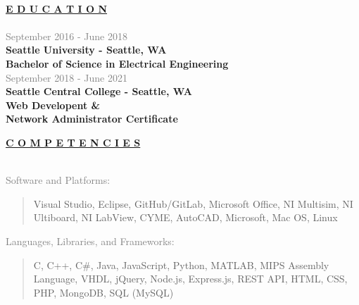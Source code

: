 \documentclass[letterpage]{article}
\begin{document}
\vspace*{20px}\\ %
\begin{minipage}[t]{0.424\linewidth}
\vspace{0pt}

\textbf{\fontsize{14px}{1px}\selectfont
  \ul{E D U C A T I O N}
}\\
\vspace{5px}\\
\textcolor{gray}{September 2016 - June 2018}\\
\textbf{\textsf{Seattle University - Seattle, WA}}\\
\textbf{Bachelor of Science in Electrical Engineering}\\

\textcolor{gray}{September 2018 - June 2021}\\
\textbf{\textsf{Seattle Central College - Seattle, WA}}\\
\textbf{Web Developent \& }\\
\textbf{Network Administrator Certificate}\\
\vspace{19px}

\textbf{\fontsize{14px}{1px}\selectfont
  \ul{C O M P E T E N C I E S}
}\\
\vspace{0px}\\
\begin{minipage}[t]{0.01\linewidth}
  \end{minipage}
  \: %

  \vspace{7px}
  \textcolor{gray}{Software and Platforms:}\\
  \begin{quote}
      \textmd{Visual Studio, Eclipse, GitHub/GitLab, Microsoft Office, NI
      Multisim, NI Ultiboard, NI LabView, CYME, AutoCAD, Microsoft, Mac OS,
      Linux}\\
  \end{quote}

  \vspace{7px}
  \textcolor{gray}{Languages, Libraries, and Frameworks:} \\ 
  \begin{quote}
    \textmd{C, C++, C\#, Java, JavaScript, Python, MATLAB, MIPS Assembly
    Language, VHDL, jQuery, Node.js, Express.js, REST API, HTML, CSS, PHP,
    MongoDB, SQL (MySQL)}\\
  \end{quote}


\end{minipage}
\end{document}
